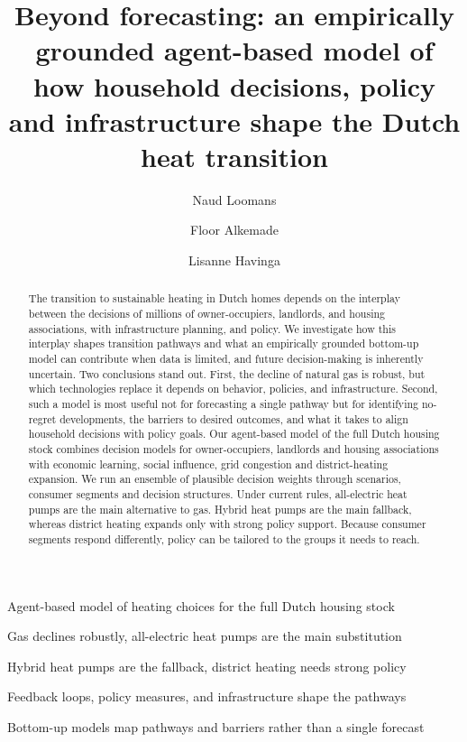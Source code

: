 \documentclass[preprint,12pt,authoryear]{elsarticle}
\def\corref#1{}%
\begin{document}
\begin{frontmatter}

\title{Beyond forecasting: an empirically grounded agent-based model of how
household decisions, policy and infrastructure shape the Dutch heat
transition}

\author[a]{Naud Loomans\corref{cor1}}
\author[a]{Floor Alkemade}
\author[a]{Lisanne Havinga}

\address[a]{Eindhoven University of Technology, Eindhoven, The Netherlands}


\begin{abstract}
The transition to sustainable heating in Dutch homes depends on the interplay
between the decisions of millions of owner-occupiers, landlords, and housing
associations, with infrastructure planning, and policy. We investigate how
this interplay shapes transition pathways and what an empirically grounded
bottom-up model can contribute when data is limited, and future
decision-making is inherently uncertain. Two conclusions stand out. First,
the decline of natural gas is robust, but which technologies replace it
depends on behavior, policies, and infrastructure. Second, such a model is
most useful not for forecasting a single pathway but for identifying
no-regret developments, the barriers to desired outcomes, and what it takes
to align household decisions with policy goals. Our agent-based model of the
full Dutch housing stock combines decision models for owner-occupiers,
landlords and housing associations with economic learning, social influence,
grid congestion and district-heating expansion. We run an ensemble of
plausible decision weights through scenarios, consumer segments and decision
structures. Under current rules, all-electric heat pumps are the main
alternative to gas. Hybrid heat pumps are the main fallback, whereas district
heating expands only with strong policy support. Because consumer segments
respond differently, policy can be tailored to the groups it needs to reach.
\end{abstract}

\begin{highlights}
\item Agent-based model of heating choices for the full Dutch housing stock
\item Gas declines robustly, all-electric heat pumps are the main
substitution
\item Hybrid heat pumps are the fallback, district heating needs strong
policy
\item Feedback loops, policy measures, and infrastructure shape the pathways
\item Bottom-up models map pathways and barriers rather than a single
forecast
\end{highlights}


\end{frontmatter}
\end{document}
